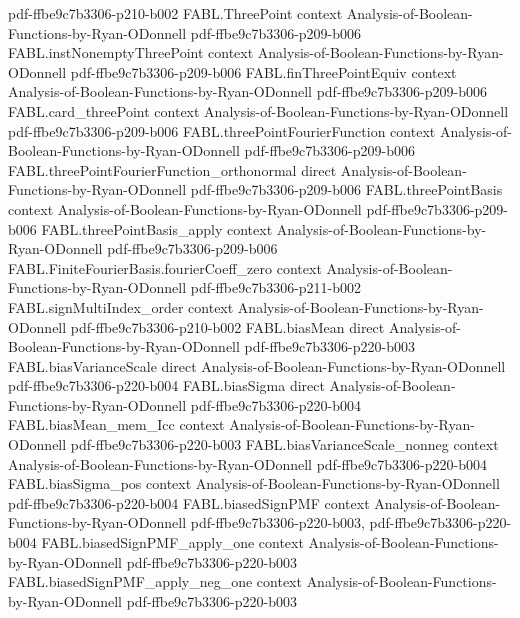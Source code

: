 \begin{theorem}
  {pdf-ffbe9c7b3306-p210-b002}
\proofstep
  {FABL.ThreePoint}
  {context}
  {Analysis-of-Boolean-Functions-by-Ryan-ODonnell}
  {pdf-ffbe9c7b3306-p209-b006}
\proofstep
  {FABL.instNonemptyThreePoint}
  {context}
  {Analysis-of-Boolean-Functions-by-Ryan-ODonnell}
  {pdf-ffbe9c7b3306-p209-b006}
\proofstep
  {FABL.finThreePointEquiv}
  {context}
  {Analysis-of-Boolean-Functions-by-Ryan-ODonnell}
  {pdf-ffbe9c7b3306-p209-b006}
\proofstep
  {FABL.card_threePoint}
  {context}
  {Analysis-of-Boolean-Functions-by-Ryan-ODonnell}
  {pdf-ffbe9c7b3306-p209-b006}
\proofstep
  {FABL.threePointFourierFunction}
  {context}
  {Analysis-of-Boolean-Functions-by-Ryan-ODonnell}
  {pdf-ffbe9c7b3306-p209-b006}
\proofstep
  {FABL.threePointFourierFunction_orthonormal}
  {direct}
  {Analysis-of-Boolean-Functions-by-Ryan-ODonnell}
  {pdf-ffbe9c7b3306-p209-b006}
\proofstep
  {FABL.threePointBasis}
  {context}
  {Analysis-of-Boolean-Functions-by-Ryan-ODonnell}
  {pdf-ffbe9c7b3306-p209-b006}
\proofstep
  {FABL.threePointBasis_apply}
  {context}
  {Analysis-of-Boolean-Functions-by-Ryan-ODonnell}
  {pdf-ffbe9c7b3306-p209-b006}
\proofstep
  {FABL.FiniteFourierBasis.fourierCoeff_zero}
  {context}
  {Analysis-of-Boolean-Functions-by-Ryan-ODonnell}
  {pdf-ffbe9c7b3306-p211-b002}
\proofstep
  {FABL.signMultiIndex_order}
  {context}
  {Analysis-of-Boolean-Functions-by-Ryan-ODonnell}
  {pdf-ffbe9c7b3306-p210-b002}
\proofstep
  {FABL.biasMean}
  {direct}
  {Analysis-of-Boolean-Functions-by-Ryan-ODonnell}
  {pdf-ffbe9c7b3306-p220-b003}
\proofstep
  {FABL.biasVarianceScale}
  {direct}
  {Analysis-of-Boolean-Functions-by-Ryan-ODonnell}
  {pdf-ffbe9c7b3306-p220-b004}
\proofstep
  {FABL.biasSigma}
  {direct}
  {Analysis-of-Boolean-Functions-by-Ryan-ODonnell}
  {pdf-ffbe9c7b3306-p220-b004}
\proofstep
  {FABL.biasMean_mem_Icc}
  {context}
  {Analysis-of-Boolean-Functions-by-Ryan-ODonnell}
  {pdf-ffbe9c7b3306-p220-b003}
\proofstep
  {FABL.biasVarianceScale_nonneg}
  {context}
  {Analysis-of-Boolean-Functions-by-Ryan-ODonnell}
  {pdf-ffbe9c7b3306-p220-b004}
\proofstep
  {FABL.biasSigma_pos}
  {context}
  {Analysis-of-Boolean-Functions-by-Ryan-ODonnell}
  {pdf-ffbe9c7b3306-p220-b004}
\proofstep
  {FABL.biasedSignPMF}
  {context}
  {Analysis-of-Boolean-Functions-by-Ryan-ODonnell}
  {pdf-ffbe9c7b3306-p220-b003,
    pdf-ffbe9c7b3306-p220-b004}
\proofstep
  {FABL.biasedSignPMF_apply_one}
  {context}
  {Analysis-of-Boolean-Functions-by-Ryan-ODonnell}
  {pdf-ffbe9c7b3306-p220-b003}
\proofstep
  {FABL.biasedSignPMF_apply_neg_one}
  {context}
  {Analysis-of-Boolean-Functions-by-Ryan-ODonnell}
  {pdf-ffbe9c7b3306-p220-b003}

\end{theorem}
